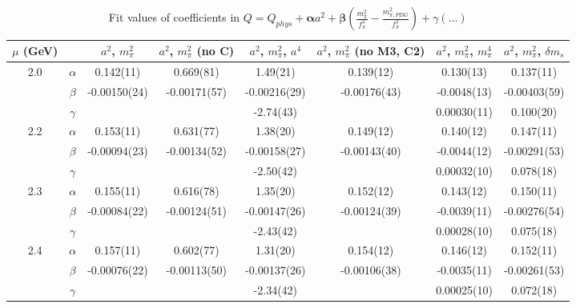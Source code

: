 \documentclass[12pt]{extarticle}
\begin{document}
\begin{table}[h!]
\begin{center}
\begin{tabular}{|c c|c|c|c|c|c|c|}
\hline
$\mu$ (GeV) &  & $a^2$, $m_\pi^2$& $a^2$, $m_\pi^2$ (no C)& $a^2$, $m_\pi^2$, $a^4$& $a^2$, $m_\pi^2$ (no M3, C2)& $a^2$, $m_\pi^2$, $m_\pi^4$& $a^2$, $m_\pi^2$, $\delta m_s$\\
\hline
\multirow{3}{0.5in}{2.0} & $\alpha$ & 0.142(11)& 0.669(81)& 1.49(21)& 0.139(12)& 0.130(13)& 0.137(11)\\
 & $\beta$ & -0.00150(24)& -0.00171(57)& -0.00216(29)& -0.00176(43)& -0.0048(13)& -0.00403(59)\\
 & $\gamma$ &  &  & -2.74(43)&  & 0.00030(11)& 0.100(20)\\
\hline
\multirow{3}{0.5in}{2.2} & $\alpha$ & 0.153(11)& 0.631(77)& 1.38(20)& 0.149(12)& 0.140(12)& 0.147(11)\\
 & $\beta$ & -0.00094(23)& -0.00134(52)& -0.00158(27)& -0.00143(40)& -0.0044(12)& -0.00291(53)\\
 & $\gamma$ &  &  & -2.50(42)&  & 0.00032(10)& 0.078(18)\\
\hline
\multirow{3}{0.5in}{2.3} & $\alpha$ & 0.155(11)& 0.616(78)& 1.35(20)& 0.152(12)& 0.143(12)& 0.150(11)\\
 & $\beta$ & -0.00084(22)& -0.00124(51)& -0.00147(26)& -0.00124(39)& -0.0039(11)& -0.00276(54)\\
 & $\gamma$ &  &  & -2.43(42)&  & 0.00028(10)& 0.075(18)\\
\hline
\multirow{3}{0.5in}{2.4} & $\alpha$ & 0.157(11)& 0.602(77)& 1.31(20)& 0.154(12)& 0.146(12)& 0.152(11)\\
 & $\beta$ & -0.00076(22)& -0.00113(50)& -0.00137(26)& -0.00106(38)& -0.0035(11)& -0.00261(53)\\
 & $\gamma$ &  &  & -2.34(42)&  & 0.00025(10)& 0.072(18)\\
\hline
\end{tabular}
\caption{Fit values of coefficients in $Q = Q_{phys} + \mathbf{\alpha} a^2 + \mathbf{\beta}\left(\frac{m_\pi^2}{f_\pi^2}-\frac{m_{\pi,PDG}^2}{f_\pi^2}\right) + \gamma(\ldots)$}
\end{center}
\end{table}






\end{document}
